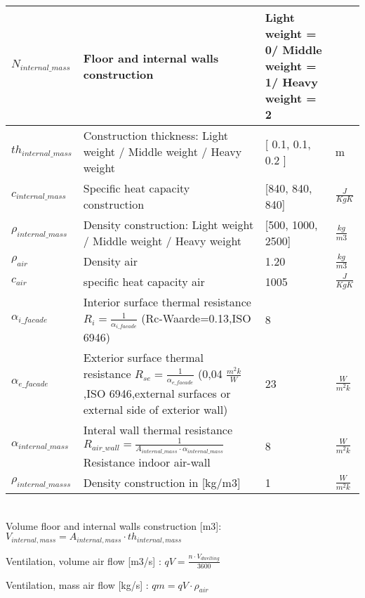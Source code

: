 \begin{tabular}{|p{3cm}||p{7cm}||p{3cm}||p{3cm}|}
 $N_{internal{\_}mass}$& Floor and internal walls construction & Light weight = 0/ Middle weight = 1/ Heavy weight = 2 &\\
 \hline
 
 $th_{internal{\_}mass}$& Construction thickness: Light weight / Middle weight / Heavy weight & [ 0.1,  0.1, 0.2 ] & m \\
 \hline
 
 $c_{internal{\_}mass}$& Specific heat capacity construction & [840, 840, 840] &$\frac{J}{KgK}$\\
 \hline
 
 $\rho_{internal{\_}mass}$& Density construction: Light weight / Middle weight / Heavy weight  & [500, 1000, 2500] &$\frac{kg}{m3}$\\
 \hline
 
 $\rho_{air}$& Density air & 1.20 &$\frac{kg}{m3}$\\
 \hline
  
 $c_{air}$& specific heat capacity air  & 1005 &$\frac{J}{KgK}$\\
 \hline
 
 $\alpha_{i{\_}facade}$ & Interior surface thermal resistance $R_{i} =\frac{1}{\alpha_{i{\_}facade}}$  (Rc-Waarde=0.13,ISO 6946) & 8 & \\
 \hline
 
 $\alpha_{e{\_}facade}$ & Exterior surface thermal resistance $R_{se} =\frac{1}{\alpha_{e{\_}facade}}$ (0,04 $\frac{m^2k}{W}$ ,ISO 6946,external surfaces or external side of exterior wall) & 23 &$\frac{W}{m^2k}$\\
 \hline
 
 $\alpha_{internal{\_}mass}$& Interal wall thermal resistance $ R_{air{\_}wall} = \frac{1}{A_{internal{\_}mass} \cdot \alpha_{internal{\_}mass}} $ Resistance indoor air-wall  & 8 &$\frac{W}{m^2k}$\\
 \hline
 
 $\rho_{internal{\_}masss}$& Density construction in [kg/m3] & 1 &$\frac{W}{m^2k}$\\
 \hline

\end{tabular}
\\

Volume floor and internal walls construction [m3]: $V_{internal,mass} = A_{internal,mass} \cdot th_{internal,mass}$

Ventilation, volume air flow [m3/s] : $qV = \frac{n \cdot V_{dwelling}}{3600} $  

Ventilation, mass air flow [kg/s] : $qm = qV \cdot \rho_{air} $  
\newline

